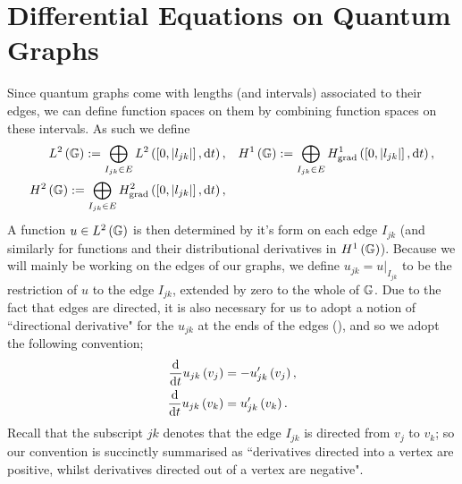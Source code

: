 \section{Differential Equations on Quantum Graphs}
Since quantum graphs come with lengths (and intervals) associated to their edges, we can define function spaces on them by combining function spaces on these intervals.
As such we define
\begin{subequations} \label{eq:GraphFuncSpaces}
	\begin{align}
		L^2\left( \mathbb{G} \right) := \bigoplus_{I_{jk}\in E} L^{2}\left( \left[ 0,\left\lvert l_{jk} \right\rvert \right],\mathrm{d}t \right),
		&\quad H^1\left( \mathbb{G} \right) := \bigoplus_{I_{jk}\in E} H^1_\mathrm{grad}\left( \left[ 0,\left\lvert l_{jk} \right\rvert \right], \mathrm{d}t \right), \\
		H^2\left( \mathbb{G} \right) := \bigoplus_{I_{jk}\in E} H^2_\mathrm{grad}\left( \left[ 0,\left\lvert l_{jk} \right\rvert \right], \mathrm{d} t \right), &
	\end{align}
\end{subequations}
A function $u\in L^2\left( \mathbb{G} \right)$ is then determined by it's form on each edge $I_{jk}$ (and similarly for functions and their distributional derivatives in $H^1\left( \mathbb{G} \right)$).
Because we will mainly be working on the edges of our graphs, we define $u_{jk} = u\vert_{I_{jk}}$ to be the restriction of $u$ to the edge $I_{jk}$, extended by zero to the whole of $\mathbb{G}$.
Due to the fact that edges are directed, it is also necessary for us to adopt a notion of ``directional derivative" for the $u_{jk}$ at the ends of the edges (), and so we adopt the following convention;
\begin{align*}
	\dfrac{\mathrm{d}}{\mathrm{d}t}u_{jk}\left( v_j \right) &= -u'_{jk}\left( v_j \right), \\
	\dfrac{\mathrm{d}}{\mathrm{d}t}u_{jk}\left( v_k \right) &= u'_{jk}\left( v_k \right).
\end{align*}
Recall that the subscript $jk$ denotes that the edge $I_{jk}$ is directed from $v_j$ to $v_k$; so our convention is succinctly summarised as ``derivatives directed into a vertex are positive, whilst derivatives directed out of a vertex are negative". 

